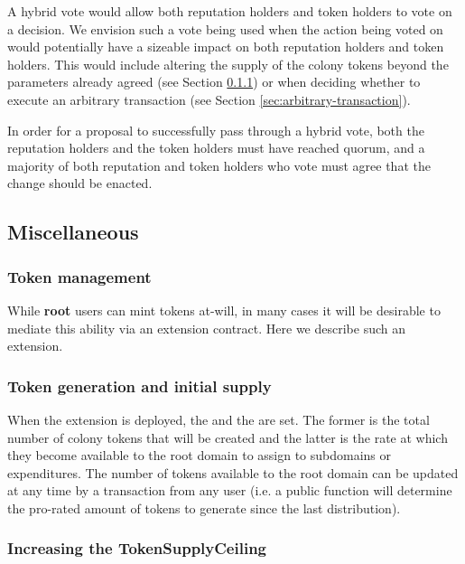 A hybrid vote would allow both reputation holders and token holders to vote on a decision. We envision such a vote being used when the action being voted on would potentially have a sizeable impact on both reputation holders and token holders. This would include altering the supply of the colony tokens beyond the parameters already agreed (see Section \ref{sec:colony-token-management}) or when deciding whether to execute an arbitrary transaction (see Section \ref{sec:arbitrary-transaction}).

In order for a proposal to successfully pass through a hybrid vote, both the reputation holders and the token holders must have reached quorum, and a majority of both reputation and token holders who vote must agree that the change should be enacted.

\subsection{Miscellaneous}\label{sec:extensions-misc}

\subsubsection{Token management}\label{sec:colony-token-management}

While \textbf{root} users can mint tokens at-will, in many cases it will be desirable to mediate this ability via an extension contract. Here we describe such an extension.

\subsubsection*{Token generation and initial supply}

When the extension is deployed, the  and the  are set. The former is the total number of colony tokens that will be created and the latter is the rate at which they become available to the root domain to assign to subdomains or expenditures. The number of tokens available to the root domain can be updated at any time by a transaction from any user (i.e. a public function will determine the pro-rated amount of tokens to generate since the last distribution).

\subsubsection*{Increasing the TokenSupplyCeiling}

